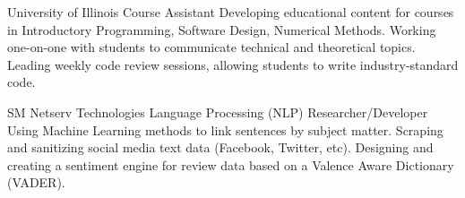 \documentclass[10pt, oneside, openany]{article} %
\begin{document}
\begin{paracol}{2}
{} %
{University of Illinois} %
{Course Assistant} %
{Developing educational content for courses in Introductory Programming, Software Design, Numerical Methods. Working one-on-one with students to communicate technical and theoretical topics. Leading weekly code review sessions, allowing students to write industry-standard code.}%

{} %
{SM Netserv Technologies} %
{Language Processing (NLP) Researcher/Developer} %
{Using Machine Learning methods to link sentences by subject matter. Scraping and sanitizing social media text data (Facebook, Twitter, etc). Designing and creating a sentiment engine for review data based on a Valence Aware Dictionary (VADER).}%












\end{paracol}
\end{document}
